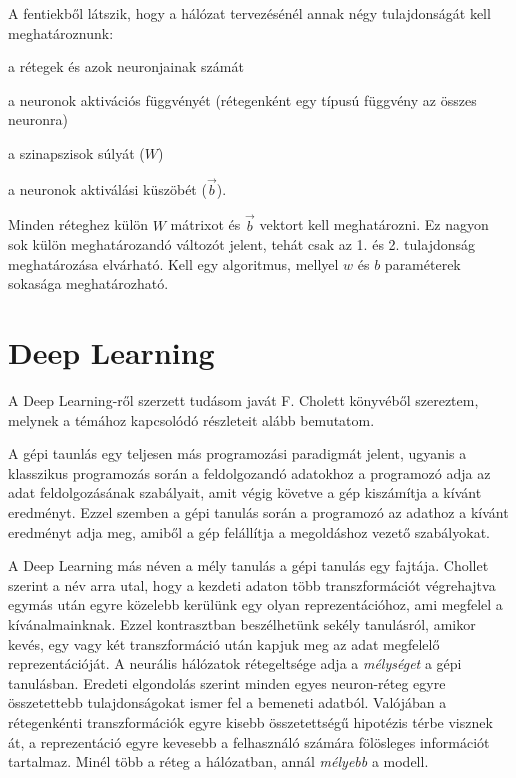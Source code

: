 A fentiekből látszik, hogy a hálózat tervezésénél annak négy tulajdonságát kell meghatároznunk:
\begin{enumerate*}
	\item a rétegek és azok neuronjainak számát
	\item a neuronok aktivációs függvényét (rétegenként egy típusú függvény az összes neuronra)
	\item a szinapszisok súlyát ($W$)
	\item a neuronok aktiválási küszöbét ($\vec{b}$).
\end{enumerate*}
Minden réteghez külön $W$ mátrixot és $\vec{b}$ vektort kell meghatározni. Ez nagyon sok külön meghatározandó változót jelent, tehát csak az 1. és 2. tulajdonság meghatározása elvárható. Kell egy algoritmus, mellyel $w$ és $b$ paraméterek sokasága meghatározható. %

\section{Deep Learning}
A Deep Learning-ről szerzett tudásom javát F. Cholett könyvéből\cite{Chollet} szereztem, melynek a témához kapcsolódó részleteit alább bemutatom.

A gépi taunlás egy teljesen más programozási paradigmát jelent, ugyanis a klasszikus programozás során a feldolgozandó adatokhoz a programozó adja az adat feldolgozásának szabályait, amit végig követve a gép kiszámítja a kívánt eredményt. Ezzel szemben a gépi tanulás során a programozó az adathoz  a kívánt eredményt adja meg, amiből a gép felállítja a megoldáshoz vezető szabályokat.%

A Deep Learning más néven a mély tanulás a gépi tanulás egy fajtája. Chollet szerint a név arra utal, hogy a kezdeti adaton több transzformációt végrehajtva egymás után egyre közelebb kerülünk egy olyan reprezentációhoz, ami megfelel a kívánalmainknak. Ezzel kontrasztban beszélhetünk sekély tanulásról, amikor kevés, egy vagy két transzformáció után kapjuk meg az adat megfelelő reprezentációját.%
A neurális hálózatok rétegeltsége adja a \emph{mélységet} a gépi tanulásban. Eredeti elgondolás szerint minden egyes neuron-réteg egyre összetettebb tulajdonságokat ismer fel a bemeneti adatból. Valójában a rétegenkénti transzformációk egyre kisebb összetettségű hipotézis térbe visznek át, a reprezentáció egyre kevesebb a felhasználó számára fölösleges információt tartalmaz. Minél több a réteg a hálózatban, annál \emph{mélyebb} a modell.

